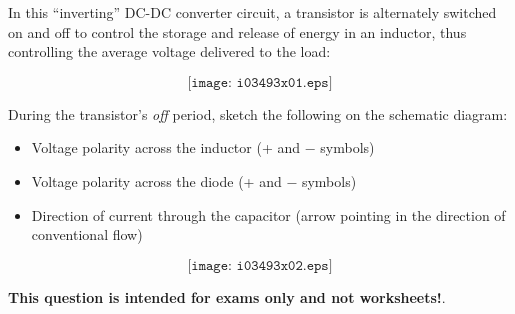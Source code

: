 

In this ``inverting'' DC-DC converter circuit, a transistor is alternately switched on and off to control the storage and release of energy in an inductor, thus controlling the average voltage delivered to the load: 

$$\texttt{[image: i03493x01.eps]}$$

During the transistor's {\it off} period, sketch the following on the schematic diagram:

\begin{itemize}
\item{} Voltage polarity across the inductor (+ and $-$ symbols)
\vskip 5pt
\item{} Voltage polarity across the diode (+ and $-$ symbols)
\vskip 5pt
\item{} Direction of current through the capacitor (arrow pointing in the direction of conventional flow)
\end{itemize}







$$\texttt{[image: i03493x02.eps]}$$







{\bf This question is intended for exams only and not worksheets!}.


